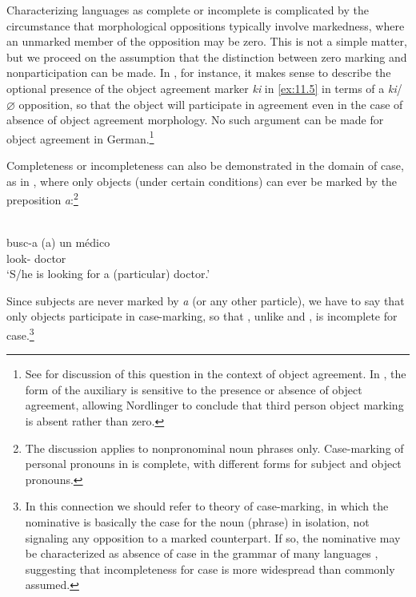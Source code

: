 \documentclass[output=paper]{langsci/langscibook}
\begin{document}
Characterizing languages as complete or incomplete is complicated by the
circumstance that morphological oppositions typically involve markedness, where
an unmarked member of the opposition may be zero. This is not a simple matter,
but we proceed on the assumption that the distinction between zero marking and
nonparticipation can be made. In , for instance, it makes sense to
describe the optional presence of the object agreement marker \emph{ki} in \eqref{ex:11.5}
in terms of a \emph{ki}/${\varnothing}$ opposition, so that the object will
participate in agreement even in the case of absence of object agreement
morphology. No such argument can be made for object agreement in
German.\footnote{See \citet[146]{Nordlinger1998} for discussion of this
    question in the context of  object agreement. In , the
form of the auxiliary is sensitive to the presence or absence of object
agreement, allowing Nordlinger to conclude that third person object marking is
absent rather than zero.\label{fn:5}}

Completeness or incompleteness can also be demonstrated in the domain of case,
as in , where only objects (under certain conditions) can ever be marked
by the preposition \emph{a}:\footnote{The discussion applies to 
    nonpronominal noun phrases only. Case-marking of personal pronouns in
     is complete, with different forms for subject and object
pronouns.\label{fn:6}}

\ea%
    \label{ex:11.6} {\parencite[80]{Leonetti2004}}\\
    \gll busc-a    (a)  un  médico\\
    look-\Tsg{} \hphantom{(}\Obj{} \Indef{}  doctor\\
    \glt ‘S/he is looking for a (particular) doctor.’
\z

\largerpage[2]
Since subjects are never marked by \emph{a} (or any other particle), we have to
say that only objects participate in case-marking, so that , unlike
 and , is incomplete for case.\footnote{In
    this connection we should refer to  theory of
    case-marking, in which the nominative is basically the case for the noun
    (phrase) in isolation, not signaling any opposition to a marked
    counterpart. If so, the nominative may be characterized as absence of case
in the grammar of many languages \citep{Zwart1988}, suggesting that
incompleteness for case is more widespread than commonly assumed.}
\end{document}
